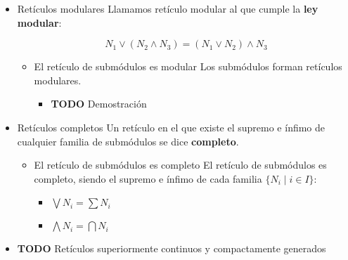 \documentclass[11pt]{article}
\begin{document}
\begin{itemize}
\item Retículos modulares
\label{sec-7-2-3-7}
Llamamos retículo modular al que cumple la \textbf{ley modular}:

\[
N_1 \vee (N_2 \wedge N_3) = (N_1 \vee N_2) \wedge N_3
\]

\begin{itemize}
\item El retículo de submódulos es modular
\label{sec-7-2-3-7-1}
Los submódulos forman retículos modulares.

\begin{itemize}
\item {\bfseries\sffamily TODO} Demostración
\label{sec-7-2-3-7-1-1}
\end{itemize}
\end{itemize}

\item Retículos completos
\label{sec-7-2-3-8}
Un retículo en el que existe el supremo e ínfimo de cualquier familia de
submódulos se dice \textbf{completo}.

\begin{itemize}
\item El retículo de submódulos es completo
\label{sec-7-2-3-8-1}
El retículo de submódulos es completo, siendo el supremo e ínfimo de
cada familia $\{ N_i \mid i \in I\}$:

\begin{itemize}
\item $\bigvee N_i = \sum N_i$

\item $\bigwedge N_i = \bigcap N_i$
\end{itemize}
\end{itemize}

\item {\bfseries\sffamily TODO} Retículos superiormente continuos y compactamente generados
\label{sec-7-2-3-9}
\end{itemize}
\end{document}
